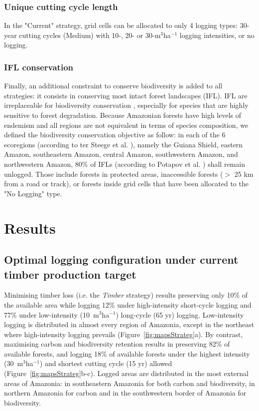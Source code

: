 \documentclass{article}
\begin{document}
\subsubsection{Unique cutting cycle length}

In the "Current" strategy, grid cells can be allocated to only 4 logging types: 30-year cutting cycles (Medium) with 10-, 20- or 30-m$^3$ha$^{-1}$ logging intensities, or no logging. 

\subsubsection{IFL conservation}

Finally, an additional constraint  to conserve biodiversity is added to all strategies: it consists in conserving most intact forest landscapes (IFL). IFL are irreplaceable for biodiversity conservation \cite{Gibson2011}, especially for species that are highly sensitive to forest degradation. Because Amazonian forests have high levels of endemism and all regions are not equivalent in terms of species composition, we defined the biodiversity conservation objective as follow: in each of the 6 ecoregions (according to ter Steege et al. \cite{TerSteege2013}), namely the Guiana Shield, eastern Amazon, southeastern Amazon, central Amazon, southwestern Amazon, and northwestern Amazon, 80\% of IFLs (according to Potapov et al. \cite{Potapov2017}) shall remain unlogged. Those include forests in protected areas, inaccessible forests ($>$ 25 km from a road or track), or forests inside grid cells that have been allocated to the "No Logging" type. 

\section{Results}

\subsection{Optimal logging configuration under current timber production target}

Minimising timber loss (i.e. the \textit{Timber} strategy) results preserving only 10\% of the available area while logging 12\% under high-intensity short-cycle logging and 77\% under low-intensity (10~m$^3$ha$^{-1}$) long-cycle (65 yr) logging. Low-intensity logging is distributed in almost every region of Amazonia, except in the northeast where high-intensity logging prevails (Figure~\ref{fig:mapsStrateg}a). 
By contrast, maximising carbon and biodiversity retention results in preserving 82\% of available forests, and logging 18\% of available forests under the highest intensity (30~m$^3$ha$^{-1}$) and shortest cutting cycle (15 yr) allowed (Figure~\ref{fig:mapsStrateg}b-c). Logged areas are distributed in the most external areas of Amazonia: in southeastern Amazonia for both carbon and biodiversity, in northern Amazonia for carbon and in the southwestern border of Amazonia for biodiversity.  
\end{document}
